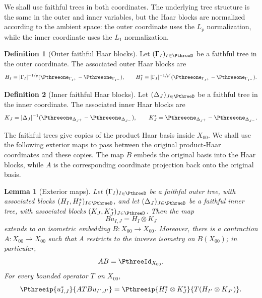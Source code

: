 \documentclass[11pt,reqno]{amsart}
\makeatletter
\theoremstyle{plain}
\newtheorem{lemma}[lemma]{Lemma}
\theoremstyle{definition}
\newtheorem{definition}[definition]{Definition}
\newcounter{problempaper}
\newenvironment{problempaperbody}{%
  \setcounter{subsection}{0}%
  \setcounter{subsubsection}{0}%
  \setcounter{paragraph}{0}%
  \renewcommand{\thesubsection}{\arabic{subsection}}%
  \renewcommand{\thesubsubsection}{\thesubsection.\arabic{subsubsection}}%
  \renewcommand{\theparagraph}{\thesubsubsection.\arabic{paragraph}}%
  \let\problem@outersection\section
  \let\problem@outersubsection\subsection
  \let\problem@outersubsubsection\subsubsection
  \let\problem@outerparagraph\paragraph
  \let\section\problem@papersection
  \let\subsection\problem@papersubsection
  \let\subsubsection\problem@papersubsubsection
}{%
  \let\section\problem@outersection
  \let\subsection\problem@outersubsection
  \let\subsubsection\problem@outersubsubsection
  \let\paragraph\problem@outerparagraph
}
\newcommand{\problem@target}[2]{%
  \hypertarget{problem-\theproblempaper-#1-#2}{}%
}
\newcommand{\problem@paperheading}[3]{%
  \par\bigskip
  \problem@target{#1}{#2}%
  \noindent{\large\bfseries #2.\quad #3\par}%
  \nobreak\smallskip
}
\newcommand{\problem@papersubheading}[3]{%
  \par\medskip
  \problem@target{#1}{#2}%
  \noindent{\normalsize\bfseries #2.\quad #3\par}%
  \nobreak\smallskip
}
\newcommand{\problem@papersubsubheading}[3]{%
  \par\smallskip
  \problem@target{#1}{#2}%
  \noindent{\normalsize\itshape #2.\quad #3.\ }%
}
\def\problem@papersection{%
  \@ifstar{\problem@papersectionstar}{\problem@papersectionnostar}%
}
\def\problem@papersectionstar#1{%
  \par\bigskip\noindent{\large\bfseries #1\par}\nobreak\smallskip
}
\def\problem@papersectionnostar#1{%
  \refstepcounter{subsection}%
  \setcounter{subsubsection}{0}%
  \setcounter{paragraph}{0}%
  \problem@paperheading{section}{\thesubsection}{#1}%
  \problem@writecontentsline{section}{\thesubsection}{#1}%
}
\def\problem@papersubsection{%
  \@ifstar{\problem@papersubsectionstar}{\problem@papersubsectionnostar}%
}
\def\problem@papersubsectionstar#1{%
  \par\medskip\noindent{\normalsize\bfseries #1\par}\nobreak\smallskip
}
\def\problem@papersubsectionnostar#1{%
  \refstepcounter{subsubsection}%
  \setcounter{paragraph}{0}%
  \problem@papersubheading{subsection}{\thesubsubsection}{#1}%
  \problem@writecontentsline{subsection}{\thesubsubsection}{#1}%
}
\def\problem@papersubsubsection{%
  \@ifstar{\problem@papersubsubsectionstar}{\problem@papersubsubsectionnostar}%
}
\def\problem@papersubsubsectionstar#1{%
  \par\smallskip\noindent{\normalsize\itshape #1.\ }%
}
\def\problem@papersubsubsectionnostar#1{%
  \refstepcounter{paragraph}%
  \problem@papersubsubheading{subsubsection}{\theparagraph}{#1}%
  \problem@writecontentsline{subsubsection}{\theparagraph}{#1}%
}
\newcommand{\problem@writecontentsline}[3]{%
  \begingroup
  \protected@write\@auxout{}{%
    \string\problemcontentsentry{\theproblempaper}{#1}{#2}{#3}{\thepage}%
  }%
  \endgroup
}
\newcommand{\problemcontentsentry}[5]{%
  \@ifundefined{problemcontents@#1}{%
    \expandafter\gdef\csname problemcontents@#1\endcsname{}%
  }{}%
  \expandafter\g@addto@macro\csname problemcontents@#1\endcsname{%
    \problemcontentsline{#1}{#2}{#3}{#4}{#5}%
  }%
}
\newcommand{\problemcontentslink}[4]{%
  \hyperlink{problem-#1-#2-#3}{#4}%
}
\newcommand{\problemcontentsline}[5]{%
  \ifstrequal{#2}{section}{%
    \par\noindent
    \problemcontentslink{#1}{#2}{#3}{\makebox[2.5em][l]{#3}#4}%
    \nobreak\dotfill
    \problemcontentslink{#1}{#2}{#3}{#5}\par
  }{%
    \ifstrequal{#2}{subsection}{%
      \par\noindent\hspace*{1.5em}%
      \problemcontentslink{#1}{#2}{#3}{\makebox[3.5em][l]{#3}#4}%
      \nobreak\dotfill
      \problemcontentslink{#1}{#2}{#3}{#5}\par
    }{%
      \par\noindent\hspace*{3em}%
      \problemcontentslink{#1}{#2}{#3}{\makebox[4.5em][l]{#3}#4}%
      \nobreak\dotfill
      \problemcontentslink{#1}{#2}{#3}{#5}\par
    }%
  }%
}
\makeatother
\begin{document}
\begin{problempaperbody}
We shall use faithful trees in both coordinates. The underlying tree structure is the same in the outer and inner variables, but the Haar blocks are normalized according to the ambient space: the outer coordinate uses the $L_p$ normalization, while the inner coordinate uses the $L_1$ normalization.

\begin{definition}[Outer faithful Haar blocks]
\label{p3:def:outer-faithful-blocks}
Let $(\Gamma_I)_{I\in\PthreeD}$ be a faithful tree in the outer coordinate. The associated outer Haar blocks are
\begin{equation*}
        H_I=|\Gamma_I|^{-1/p}(\Pthreeone_{\Gamma_{I^+}}-\Pthreeone_{\Gamma_{I^-}}),\qquad H_I^*=|\Gamma_I|^{-1/p'}(\Pthreeone_{\Gamma_{I^+}}-\Pthreeone_{\Gamma_{I^-}}).
\end{equation*}
\end{definition}

\begin{definition}[Inner faithful Haar blocks]
\label{p3:def:inner-faithful-blocks}
Let $(\Delta_J)_{J\in\PthreeD}$ be a faithful tree in the inner coordinate. The associated inner Haar blocks are
\begin{equation*}
        K_J=|\Delta_J|^{-1}(\Pthreeone_{\Delta_{J^+}}-\Pthreeone_{\Delta_{J^-}}),\qquad K_J^*=\Pthreeone_{\Delta_{J^+}}-\Pthreeone_{\Delta_{J^-}}.
\end{equation*}
\end{definition}

The faithful trees give copies of the product Haar basis inside $X_{00}$. We shall use the following exterior maps to pass between the original product-Haar coordinates and these  copies. The map $B$ embeds the original basis into the  Haar blocks, while $A$ is the corresponding coordinate projection back onto the original basis.

\begin{lemma}[Exterior maps]
\label{p3:lem:exterior}
Let $(\Gamma_I)_{I\in\PthreeD}$ be a  faithful outer tree, with associated blocks $(H_I,H_I^*)_{I\in\PthreeD}$, and let $(\Delta_J)_{J\in\PthreeD}$ be a  faithful inner tree, with associated blocks $(K_J,K_J^*)_{J\in\PthreeD}$. Then the map
\begin{equation*}
        B u_{I,J}=H_I\otimes K_J
\end{equation*}
extends to an isometric embedding $B\colon X_{00}\to X_{00}$. Moreover, there is a contraction $A\colon X_{00}\to X_{00}$ such that $A$ restricts to the inverse isometry on $B(X_{00})$; in particular,
\begin{equation*}
        AB=\PthreeId_{X_{00}}.
\end{equation*}
For every bounded operator $T$ on $X_{00}$,
\begin{equation*}
        \Pthreeip{u_{I,J}^*}{ATB u_{I',J'}}=\Pthreeip{H_I^*\otimes K_J^*}{T(H_{I'}\otimes K_{J'})}.
\end{equation*}
\end{lemma}


\end{problempaperbody}
\end{document}
